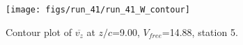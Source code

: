 \begin{figure}[H]
\centering
\texttt{[image: figs/run\_41/run\_41\_W\_contour]}
\caption{Contour plot of $\overline{v_{z}}$ at $z/c$=9.00, $V_{free}$=14.88, station 5.}
\label{fig:run_41_W_contour}
\end{figure}


